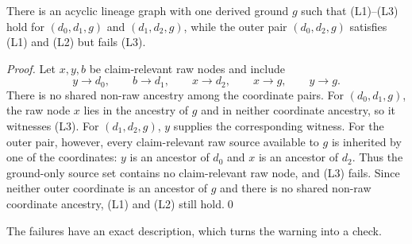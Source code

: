 \documentclass[twocolumn,envcountsect,envcountsame,natbib]{svjour3}
\begin{document}
\begin{proposition}\label{ex:prop:l3-noncompose}
There is an acyclic lineage graph with one derived ground $g$ such that (L1)--(L3) hold for $(d_0,d_1,g)$ and $(d_1,d_2,g)$, while the outer pair $(d_0,d_2,g)$ satisfies (L1) and (L2) but fails (L3).
\end{proposition}
\begin{proof}
Let $x,y,b$ be claim-relevant raw nodes and include
\[
y\to d_0,\qquad b\to d_1,\qquad x\to d_2,\qquad x\to g,\qquad y\to g.
\]
There is no shared non-raw ancestry among the coordinate pairs. For $(d_0,d_1,g)$, the raw node $x$ lies in the ancestry of $g$ and in neither coordinate ancestry, so it witnesses (L3). For $(d_1,d_2,g)$, $y$ supplies the corresponding witness. For the outer pair, however, every claim-relevant raw source available to $g$ is inherited by one of the coordinates: $y$ is an ancestor of $d_0$ and $x$ is an ancestor of $d_2$. Thus the ground-only source set contains no claim-relevant raw node, and (L3) fails. Since neither outer coordinate is an ancestor of $g$ and there is no shared non-raw coordinate ancestry, (L1) and (L2) still hold.\qed
\end{proof}

The failures have an exact description, which turns the warning into a check.
\end{document}
